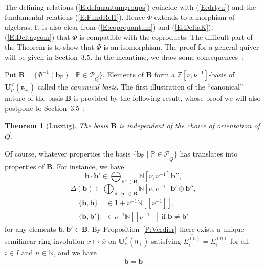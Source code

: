 \documentclass[a4paper,10pt]{amsart}
\def\Z{\mathbb{Z}}
\def\U{\mathbf{U}}
\def\N{\mathbb{N}}
\def\n{\mathfrak{n}}
\def\v{\nu}
\newtheorem{theo}{\bf{Theorem}}[section]
\numberwithin{equation}{section}
\begin{document}
\vspace{.1in}

The defining relations (\ref{E:defquantumgroups}) coincide with (\ref{E:drtyu}) and the fundamental relations (\ref{E:FundRel1}). Hence $\Phi$ extends to a morphism of algebras. It is also clear from (\ref{E:coprquantum}) and (\ref{E:DeltaK}), (\ref{E:Deltageom}) that $\Phi$ is compatible with the coproducts.
The difficult part of the Theorem is to show that $\Phi$ is an isomorphism. The proof for a general quiver will be given in Section~3.5. In the meantime, we draw some consequences~:

\vspace{.1in}

Put $\mathbf{B}=\big\{\Phi^{-1}(\mathbf{b}_{\mathbb{P}})\;|\; \mathbb{P} \in \mathcal{P}_{\vec{Q}}\big\}$. Elements of $\mathbf{B}$ form a $\Z[\v,\v^{-1}]$-basis of $\U^{\Z}_{\v}(\n_+)$ called the \textit{canonical basis}. The first illustration of the ``canonical'' nature of the basis $\mathbf{B}$ is provided by the following result, whose proof we will also postpone to Section~3.5~:

\vspace{.1in}

\begin{theo}[Lusztig]\label{T:LUU} The basis $\mathbf{B}$ is independent of the choice of orientation of $\vec{Q}$.
\end{theo}

\vspace{.1in}

Of course, whatever properties the basis $\big\{\mathbf{b}_{\mathbb{P}}\;|\; \mathbb{P} \in \mathcal{P}_{\vec{Q}}\big\}$ has translates into properties of $\mathbf{B}$. For instance, we have
\begin{equation}\label{E:Posmult2}
\mathbf{b} \cdot \mathbf{b}' \in \bigoplus_{\mathbf{b}'' \in \mathbf{B}} \N[\v,\v^{-1}] \mathbf{b}'',
\end{equation}
\begin{equation}\label{E:Poscop2}
\Delta(\mathbf{b} ) \in \bigoplus_{\mathbf{b}', \mathbf{b}'' \in \mathbf{B}} \N[\v,\v^{-1}] \mathbf{b}' \otimes \mathbf{b}'',
\end{equation}
\begin{equation}\label{E:Posscal2}
\begin{split}
\{\mathbf{b},\mathbf{b}\} &\in 1+\v^{-1}\N[[\v^{-1}]], \\
\{\mathbf{b},\mathbf{b}'\} &\in \v^{-1}\N[[\v^{-1}]]\;\text{if}\; \mathbf{b} \neq \mathbf{b}'
\end{split}
\end{equation}
for any elements $\mathbf{b},\mathbf{b}' \in \mathbf{B}$. By Proposition~\ref{P:Verdier} there exists a unique semilinear ring involution $x \mapsto \overline{x}$ on $\U_{\nu}^{\Z}(\n_+)$ satisfying $\overline{E_i^{(n)}}=E_i^{(n)}$ for all $i \in I$ and $n \in \N$, and we have
\begin{equation}\label{E:Invol}
\overline{\mathbf{b}}=\mathbf{b}
\end{equation}
\end{document}
